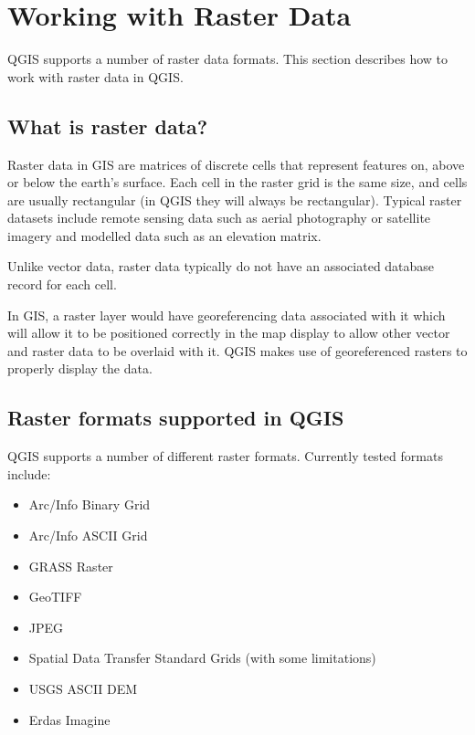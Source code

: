 \section{Working with Raster Data}\label{label_raster}

QGIS supports a number of raster data formats. This section describes how to
work with raster data in QGIS.

\subsection{What is raster data?}\label{label_whatsraster}

Raster data in GIS are matrices of discrete cells that represent features on,
above or below the earth's surface. Each cell in the raster grid is the same
size, and cells are usually rectangular (in QGIS they will always be
rectangular). Typical raster datasets include remote sensing data such as
aerial photography or satellite imagery and modelled data such as an elevation
matrix.

Unlike vector data, raster data typically do not have an associated database
record for each cell.

In GIS, a raster layer would have georeferencing data associated with it which
will allow it to be positioned correctly in the map display to allow other
vector and raster data to be overlaid with it. QGIS makes use of georeferenced
rasters to properly display the data.
	
\subsection{Raster formats supported in QGIS}\label{label_rastformats}
QGIS supports a number of different raster formats. Currently tested formats
include:

\begin{itemize}
\item Arc/Info Binary Grid
\item Arc/Info ASCII Grid
\item GRASS Raster
\item GeoTIFF
\item JPEG
\item Spatial Data Transfer Standard Grids (with some limitations)
\item USGS ASCII DEM
\item Erdas Imagine
\end{itemize}

